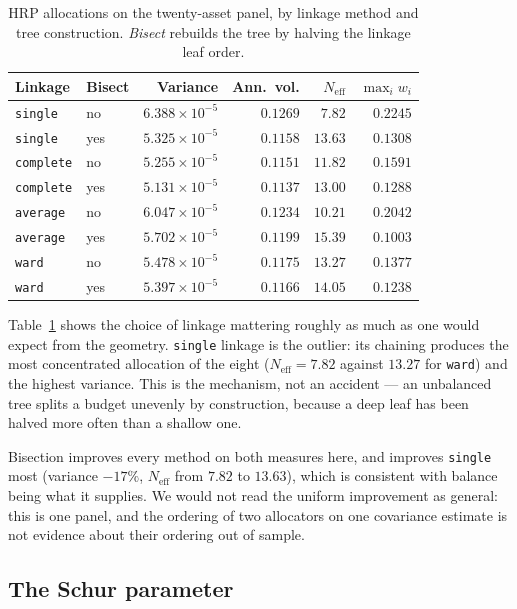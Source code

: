 \documentclass[11pt,a4paper]{article}
\newcommand{\code}[1]{\texttt{#1}}
\begin{document}
\begin{table}[t]
\centering
\caption{HRP allocations on the twenty-asset panel, by linkage method and tree
construction. \emph{Bisect} rebuilds the tree by halving the linkage leaf order.}
\label{tab:linkage}
\begin{tabular}{llrrrr}
\toprule
Linkage & Bisect & Variance & Ann.\ vol. & $N_{\mathrm{eff}}$ & $\max_i w_i$ \\
\midrule
\code{single}   & no  & $6.388 \times 10^{-5}$ & $0.1269$ & $7.82$  & $0.2245$ \\
\code{single}   & yes & $5.325 \times 10^{-5}$ & $0.1158$ & $13.63$ & $0.1308$ \\
\code{complete} & no  & $5.255 \times 10^{-5}$ & $0.1151$ & $11.82$ & $0.1591$ \\
\code{complete} & yes & $5.131 \times 10^{-5}$ & $0.1137$ & $13.00$ & $0.1288$ \\
\code{average}  & no  & $6.047 \times 10^{-5}$ & $0.1234$ & $10.21$ & $0.2042$ \\
\code{average}  & yes & $5.702 \times 10^{-5}$ & $0.1199$ & $15.39$ & $0.1003$ \\
\code{ward}     & no  & $5.478 \times 10^{-5}$ & $0.1175$ & $13.27$ & $0.1377$ \\
\code{ward}     & yes & $5.397 \times 10^{-5}$ & $0.1166$ & $14.05$ & $0.1238$ \\
\bottomrule
\end{tabular}
\end{table}

Table~\ref{tab:linkage} shows the choice of linkage mattering roughly as much as
one would expect from the geometry. \code{single} linkage is the outlier: its
chaining produces the most concentrated allocation of the eight
($N_{\mathrm{eff}} = 7.82$ against $13.27$ for \code{ward}) and the highest
variance. This is the mechanism, not an accident --- an unbalanced tree splits a
budget unevenly by construction, because a deep leaf has been halved more often
than a shallow one.

Bisection improves every method on both measures here, and improves
\code{single} most (variance $-17\%$, $N_{\mathrm{eff}}$ from $7.82$ to
$13.63$), which is consistent with balance being what it supplies. We would not
read the uniform improvement as general: this is one panel, and the ordering of
two allocators on one covariance estimate is not evidence about their ordering
out of sample.

\subsection{The Schur parameter}
\end{document}
